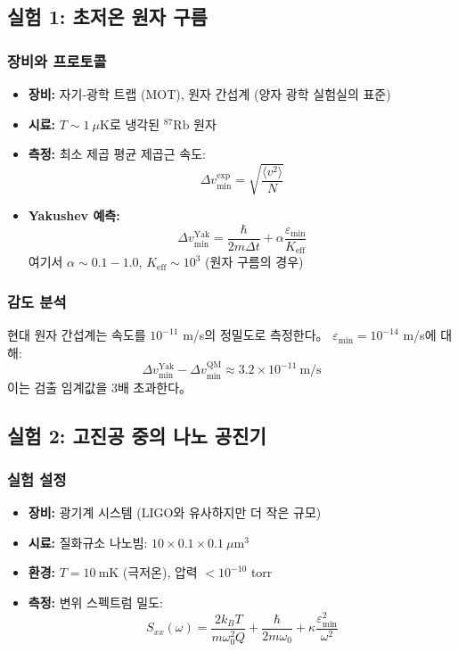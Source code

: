 \documentclass[11pt,a4paper]{article}
\begin{document}
\subsection{실험 1: 초저온 원자 구름}

\subsubsection{장비와 프로토콜}
\begin{itemize}
\item \textbf{장비:} 자기-광학 트랩 (MOT), 원자 간섭계 (양자 광학 실험실의 표준)
\item \textbf{시료:} $T \sim 1\ \mu\text{K}$로 냉각된 $^{87}\text{Rb}$ 원자
\item \textbf{측정:} 최소 제곱 평균 제곱근 속도:
\[
\Delta v_{\min}^{\text{exp}} = \sqrt{\frac{\langle v^2 \rangle}{N}}
\]
\item \textbf{Yakushev 예측:}
\[
\Delta v_{\min}^{\text{Yak}} = \frac{\hbar}{2m\Delta t} + \alpha \frac{\varepsilon_{\min}}{K_{\mathrm{eff}}}
\]
여기서 $\alpha \sim 0.1-1.0$, $K_{\mathrm{eff}} \sim 10^3$ (원자 구름의 경우)
\end{itemize}

\subsubsection{감도 분석}

현대 원자 간섭계는 속도를 $10^{-11}$ m/s의 정밀도로 측정한다。 $\varepsilon_{\min} = 10^{-14}$ m/s에 대해:
\[
\Delta v_{\min}^{\text{Yak}} - \Delta v_{\min}^{\text{QM}} \approx 3.2 \times 10^{-11}\ \text{m/s}
\]
이는 검출 임계값을 3배 초과한다。

\subsection{실험 2: 고진공 중의 나노 공진기}

\subsubsection{실험 설정}
\begin{itemize}
\item \textbf{장비:} 광기계 시스템 (LIGO와 유사하지만 더 작은 규모)
\item \textbf{시료:} 질화규소 나노빔: $10 \times 0.1 \times 0.1\ \mu\text{m}^3$
\item \textbf{환경:} $T = 10\ \text{mK}$ (극저온), 압력 $< 10^{-10}$ torr
\item \textbf{측정:} 변위 스펙트럼 밀도:
\[
S_{xx}(\omega) = \frac{2k_B T}{m\omega_0^2 Q} + \frac{\hbar}{2m\omega_0} + \kappa\frac{\varepsilon_{\min}^2}{\omega^2}
\]
\end{itemize}
\end{document}
